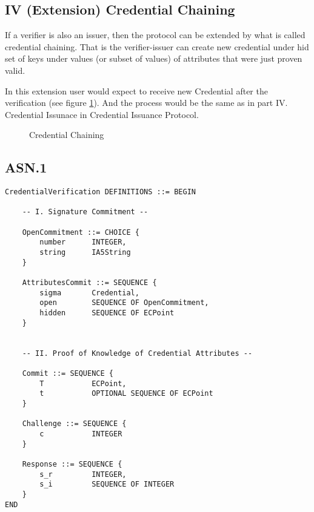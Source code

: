 \subsection*{IV (Extension) Credential Chaining}
If a verifier is also an issuer, then the protocol can be extended by what is called credential chaining. That is the verifier-issuer can create new credential under hid set of keys under values (or subset of values) of attributes that were just proven valid.

In this extension user would expect to receive new \textsf{Credential} after the verification (see figure \ref{tech:verify-chaining}). And the process would be the same as in part IV. Credential Issunace in Credential Issuance Protocol.

\begin{figure}[H]
\centering
{}
\caption{Credential Chaining}
\label{tech:verify-chaining}
\end{figure}


\subsection*{ASN.1}
\begin{verbatim}
CredentialVerification DEFINITIONS ::= BEGIN

    -- I. Signature Commitment --

    OpenCommitment ::= CHOICE {
        number      INTEGER,
        string      IA5String
    }

    AttributesCommit ::= SEQUENCE {
        sigma       Credential,
        open        SEQUENCE OF OpenCommitment,
        hidden      SEQUENCE OF ECPoint
    }


    -- II. Proof of Knowledge of Credential Attributes --

    Commit ::= SEQUENCE {
        T           ECPoint,
        t           OPTIONAL SEQUENCE OF ECPoint
    }
    
    Challenge ::= SEQUENCE {
        c           INTEGER
    }
    
    Response ::= SEQUENCE {
        s_r         INTEGER,
        s_i         SEQUENCE OF INTEGER
    }
END
\end{verbatim}

